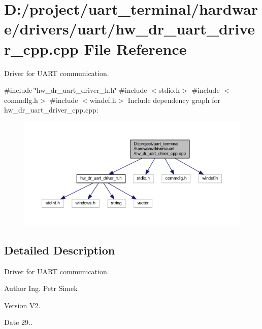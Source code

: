 \section{D\+:/project/uart\+\_\+terminal/hardware/drivers/uart/hw\+\_\+dr\+\_\+uart\+\_\+driver\+\_\+cpp.cpp File Reference}
\label{hw__dr__uart__driver__cpp_8cpp}


Driver for U\+A\+RT communication.  


{\ttfamily \#include \char`\"{}hw\+\_\+dr\+\_\+uart\+\_\+driver\+\_\+h.\+h\char`\"{}}\newline
{\ttfamily \#include $<$stdio.\+h$>$}\newline
{\ttfamily \#include $<$commdlg.\+h$>$}\newline
{\ttfamily \#include $<$windef.\+h$>$}\newline
Include dependency graph for hw\+\_\+dr\+\_\+uart\+\_\+driver\+\_\+cpp.\+cpp\+:\nopagebreak
\begin{figure}[H]
\begin{center}
\leavevmode
\includegraphics[width=350pt]{hw__dr__uart__driver__cpp_8cpp__incl}
\end{center}
\end{figure}


\subsection{Detailed Description}
Driver for U\+A\+RT communication. 

\begin{DoxyAuthor}{Author}
Ing. Petr Simek 
\end{DoxyAuthor}
\begin{DoxyVersion}{Version}
V2. 
\end{DoxyVersion}
\begin{DoxyDate}{Date}
29.. 
\end{DoxyDate}
